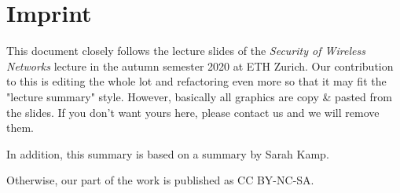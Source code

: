 %
%
\appendix


\section{Imprint}

This document closely follows the lecture slides of the \textit{Security of Wireless Networks} lecture in the autumn semester 2020 at ETH Zurich.
Our contribution to this is editing the whole lot and refactoring even more so that it may fit the "lecture summary" style.
However, basically all graphics are copy \& pasted from the slides. If you don't want yours here, please contact us and we will remove them.

In addition, this summary is based on a summary by Sarah Kamp.

Otherwise, our part of the work is published as CC BY-NC-SA.



%
%